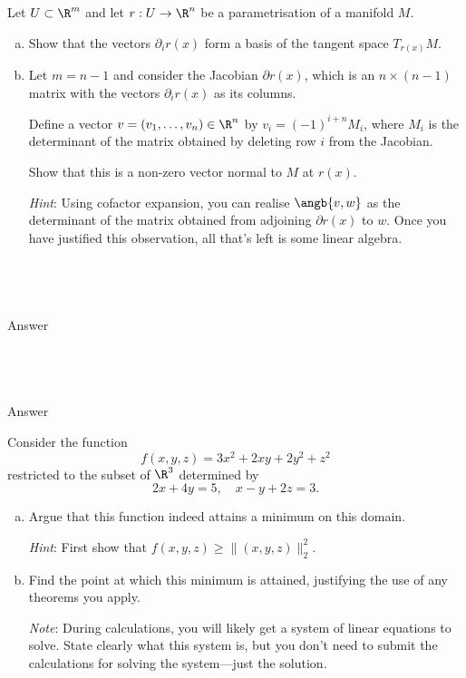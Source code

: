 \documentclass[a4paper]{article}
\begin{document}
\begin{questionbody}
Let $U \subset \R^m$ and let $r : U \to \R^n$ be a parametrisation of a manifold $M$.

\begin{enumerate}[(a)]
\item Show that the vectors $\partial_i r(x)$ form a basis of the tangent space $T_{r(x)} M$.

\item Let $m = n - 1$ and consider the Jacobian $\partial r(x)$, which is an $n \times (n-1)$ matrix with the vectors $\partial_i r(x)$ as its columns.

Define a vector $v = (v_1, \dotsc, v_n) \in \R^n$ by $v_i = {(-1)}^{i+n} M_i$, where $M_i$ is the determinant of the matrix obtained by deleting row $i$ from the Jacobian.

Show that this is a non-zero vector normal to $M$ at $r(x)$.

\textit{Hint}: Using cofactor expansion, you can realise $\angb{v, w}$ as the determinant of the matrix obtained from adjoining $\partial r(x)$ to $w$. Once you have justified this observation, all that's left is some linear algebra.
\end{enumerate}
\end{questionbody}

\subsection{~} %

Answer

\subsection{~} %

Answer



\begin{questionbody}
Consider the function \[
f(x, y, z) = 3x^2 + 2xy + 2y^2 + z^2
\] restricted to the subset of $\R^3$ determined by \[
2x + 4y = 5, \quad x - y + 2z = 3.
\]

\begin{enumerate}[(a)]
\item Argue that this function indeed attains a minimum on this domain.

\textit{Hint}: First show that $f(x, y, z) \ge \|(x, y, z)\|_2^2$.

\item Find the point at which this minimum is attained, justifying the use of any theorems you apply.

\textit{Note}: During calculations, you will likely get a system of linear equations to solve. State clearly what this system is, but you don't need to submit the calculations for solving the system---just the solution.
\end{enumerate}
\end{questionbody}
\end{document}
